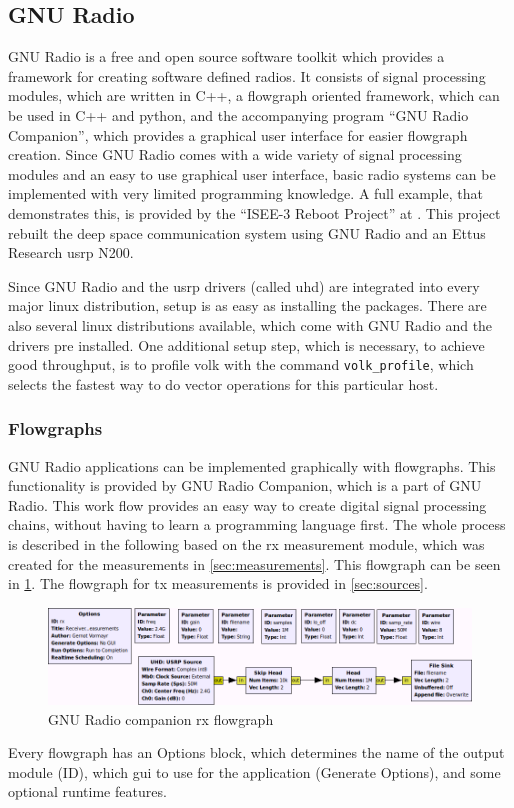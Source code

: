 \documentclass[12pt,a4paper,parskip=full,abstracton]{scrartcl}
\begin{document}
\subsection{GNU Radio}
\label{sec:intgnu}
GNU Radio is a free and open source software toolkit which provides a
framework for creating software defined radios. It consists
of signal processing modules, which are written in C++, a flowgraph oriented framework, which can be
used in C++ and python, and the accompanying program ``GNU Radio Companion''\cite{gnuradio_grc},
which provides a graphical user interface for easier flowgraph creation. Since GNU Radio comes
with a wide variety of signal processing modules and an easy to use graphical user interface,
basic radio systems can be implemented with very limited programming knowledge. A full example,
that demonstrates this, is provided by the ``ISEE-3 Reboot Project'' at \cite{isee3}. This project
rebuilt the deep space communication system using GNU Radio and an Ettus Research \gls{usrp} N200.

Since GNU Radio and the \gls{usrp} drivers (called \gls{uhd}) are integrated into every
major linux distribution, setup is as easy as installing the packages. There are
also several linux distributions available, which come with GNU Radio and the drivers
pre installed. One additional setup step, which is necessary, to achieve good throughput,
is to profile \gls{volk} with the command \verb+volk_profile+, which selects the
fastest way to do vector operations for this particular host\cite{gnuradio_volk}.

\subsubsection{Flowgraphs}
GNU Radio applications can be implemented graphically with flowgraphs. This functionality is
provided by GNU Radio Companion, which is a part of GNU Radio. This work flow provides an
easy way to create digital signal processing chains, without having to learn a programming language
first. The whole process is described in the following based on the \gls{rx} measurement module, which was
created for the measurements in \cref{sec:measurements}. This flowgraph can be seen in
\cref{fig:grc_rx}. The flowgraph for \gls{tx} measurements is provided in \cref{sec:sources}.

\begin{figure}[htb]
    \centering
    \includegraphics[width=\linewidth]{grc}
    \caption{GNU Radio companion \gls{rx} flowgraph}
    \label{fig:grc_rx}
\end{figure}
Every flowgraph has an {\ttfamily Options} block, which determines the name of the output module ({\ttfamily ID}),
which \gls{gui} to use for the application ({\ttfamily Generate Options}), and some optional runtime features.
\end{document}
